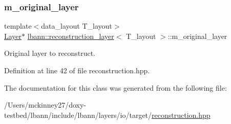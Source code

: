 \subsubsection{\texorpdfstring{m\+\_\+original\+\_\+layer}{m\_original\_layer}}
{\footnotesize\ttfamily template$<$data\+\_\+layout T\+\_\+layout$>$ \\
\hyperlink{classlbann_1_1Layer}{Layer}$\ast$ \hyperlink{classlbann_1_1reconstruction__layer}{lbann\+::reconstruction\+\_\+layer}$<$ T\+\_\+layout $>$\+::m\+\_\+original\+\_\+layer\hspace{0.3cm}{\ttfamily [private]}}

Original layer to reconstruct. 

Definition at line 42 of file reconstruction.\+hpp.



The documentation for this class was generated from the following file\+:\begin{DoxyCompactItemize}
\item 
/\+Users/mckinney27/doxy-\/testbed/lbann/include/lbann/layers/io/target/\hyperlink{reconstruction_8hpp}{reconstruction.\+hpp}\end{DoxyCompactItemize}
